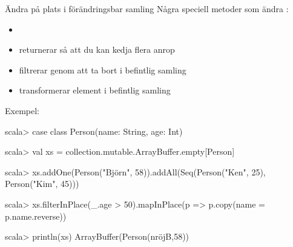 \begin{Slide}{Ändra på plats i förändringsbar samling}\SlideFontSmall
Några speciell metoder som ändra :
\begin{itemize}
\item {}
\item returnerar  så att du kan kedja flera anrop
\item {} filtrerar genom att ta bort i befintlig samling
\item {} transformerar element i befintlig samling
\end{itemize}
Exempel:
\begin{REPLsmall}
scala> case class Person(name: String, age: Int)

scala> val xs = collection.mutable.ArrayBuffer.empty[Person]

scala> xs.addOne(Person("Björn", 58)).addAll(Seq(Person("Ken", 25), Person("Kim", 45)))

scala> xs.filterInPlace(_.age > 50).mapInPlace(p => p.copy(name = p.name.reverse))

scala> println(xs)
ArrayBuffer(Person(nröjB,58))

\end{REPLsmall}
\end{Slide}








